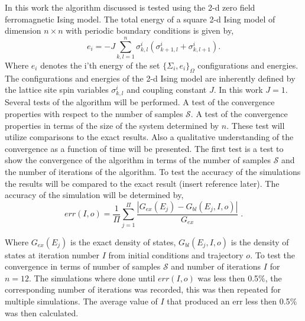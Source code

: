 \documentclass[twocolumn]{article}
\begin{document}
In this work the algorithm discussed is tested using the 2-d zero field ferromagnetic Ising model. The total energy of a square 2-d Ising model of dimension  $n\times n$ with periodic boundary conditions is given by, 
\begin{equation}
e_i = -J\sum_{k,l =1}^n \sigma^i_{k,l} 
\left( \sigma^i_{k+1,l} + \sigma^i_{k,l+1}
\right). \label{2D}
\end{equation}
Where $e_i$ denotes the i'th energy of the set  $\{\Sigma_i, e_i \}_{\Omega} $ configurations and energies. The configurations and energies of the 2-d Ising model are inherently defined by the lattice site spin variables $\sigma^i_{k,l}$ and coupling constant $J$. In this work $J=1$. Several tests of the algorithm will be performed. A test of the convergence properties with respect to the number of samples $\mathcal{S}$. A test of the convergence properties in terms of the size of the system determined by $n$. These test will utilize comparisons to the exact results. Also a qualitative understanding of the convergence as a function of time will be presented. 
The first test is a test to show the convergence of the algorithm in terms of the number of samples $\mathcal{S}$ and the number of iterations of the algorithm. To test the accuracy of the simulations the results will be compared to the exact result (insert reference later). The accuracy of the simulation will be determined by, 
\begin{equation}
err(I,o)  = \frac{1}{\Pi} \sum_{j=1}^{\Pi}\frac{|G_{ex}(E_j) - G_{bl}(E_j,I,o)|}{G_{ex}}\; . 
\end{equation}

Where $G_{ex}(E_j)$ is the exact density of states, $G_{bl}(E_j,I,o)$ is the density of states at iteration number $I$ from initial conditions and trajectory $o$.
To test the convergence in terms of number of samples $\mathcal{S}$ and number of iterations $I$ for $n=12$.  The simulations where done until $err(I,o)$ was less then 0.5$\%$, the corresponding number of iterations was recorded, this was then repeated for multiple simulations. The average value of $I$ that produced an err less then 0.5$\%$ was then calculated. 
\end{document}
